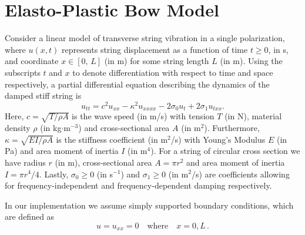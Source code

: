     \section{Elasto-Plastic Bow Model}\label{sec:elasto}
    
    Consider a linear model of transverse string vibration in a single polarization, where $u(x,t)$ represents string displacement as a function of time $t\geq 0$, in s, and coordinate $x\in[0,\,L]$ (in m) for some string length $L$ (in m). Using the subscripts $t$ and $x$ to denote differentiation with respect to time and space respectively, a partial differential equation describing the dynamics of the damped stiff string is \cite{Bilbao2009}
    \begin{equation}\label{eq:PDE}
        u_{tt} = c^2u_{xx}-\kappa^2u_{xxxx}-2\sigma_0u_t+2\sigma_1u_{txx}.
    \end{equation}
    Here, $c = \sqrt{T/\rho A}$ is the wave speed (in m/s) with tension $T$ (in N), material density $\rho$ (in kg$\cdot$m$^{-3}$) and cross-sectional area $A$ (in m$^2$). Furthermore, $\kappa = \sqrt{EI/\rho A}$ is the stiffness coefficient (in m$^2$/s) with Young's Modulus $E$ (in Pa) and area moment of inertia $I$ (in m$^4$). For a string of circular cross section we have radius $r$ (in m), cross-sectional area $A=\pi r^2$ and area moment of inertia $I=\pi r^4 /4$.  Lastly, $\sigma_0 \geq 0$ (in s$^{-1}$) and $\sigma_1 \geq 0$ (in m$^2$/s) 
    are coefficients allowing for frequency-independent and frequency-dependent damping respectively. 
    
    In our implementation we assume simply supported boundary conditions, which are defined as
    \begin{equation}
        u = u_{xx} = 0 \quad \text{where} \quad x = 0, L\, .
    \end{equation}
    
